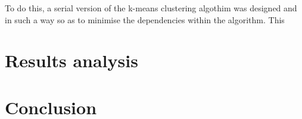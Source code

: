 \documentclass[12pt]{article}
\begin{document}
    	\begin{flushleft}
    		To do this, a serial version of the k-means clustering algothim was designed and in such a way so as to minimise the dependencies within the algorithm. This
    	\end{flushleft}

  	\section{Results analysis}
    	\begin{flushleft}
			
    	\end{flushleft}

	\section{Conclusion}
    	\begin{flushleft}
			
    	\end{flushleft}
\end{document}
